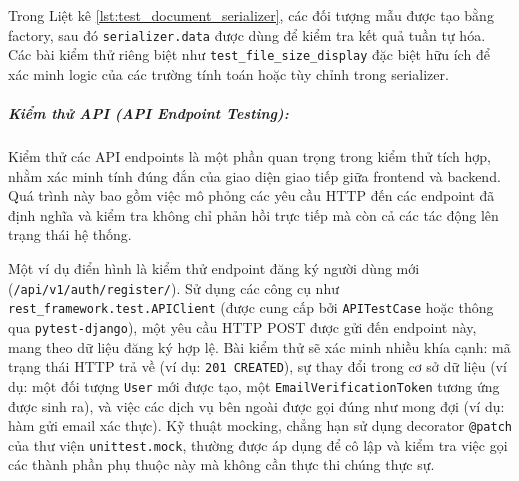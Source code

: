 Trong Liệt kê \ref{lst:test_document_serializer}, các đối tượng mẫu được tạo bằng factory, sau đó \texttt{serializer.data} được dùng để kiểm tra kết quả tuần tự hóa. Các bài kiểm thử riêng biệt như \texttt{test\_file\_size\_display} đặc biệt hữu ích để xác minh logic của các trường tính toán hoặc tùy chỉnh trong serializer.

\subparagraph{Kiểm thử API (API Endpoint Testing): }



Kiểm thử các API endpoints là một phần quan trọng trong kiểm thử tích hợp, nhằm xác minh tính đúng đắn của giao diện giao tiếp giữa frontend và backend. Quá trình này bao gồm việc mô phỏng các yêu cầu HTTP đến các endpoint đã định nghĩa và kiểm tra không chỉ phản hồi trực tiếp mà còn cả các tác động lên trạng thái hệ thống.

Một ví dụ điển hình là kiểm thử endpoint đăng ký người dùng mới (\texttt{/api/v1/auth/register/}). Sử dụng các công cụ như \texttt{rest\_framework.test.APIClient} (được cung cấp bởi \texttt{APITestCase} hoặc thông qua \texttt{pytest-django}), một yêu cầu HTTP POST được gửi đến endpoint này, mang theo dữ liệu đăng ký hợp lệ. Bài kiểm thử sẽ xác minh nhiều khía cạnh: mã trạng thái HTTP trả về (ví dụ: \texttt{201 CREATED}), sự thay đổi trong cơ sở dữ liệu (ví dụ: một đối tượng \texttt{User} mới được tạo, một \texttt{EmailVerificationToken} tương ứng được sinh ra), và việc các dịch vụ bên ngoài được gọi đúng như mong đợi (ví dụ: hàm gửi email xác thực). Kỹ thuật mocking, chẳng hạn sử dụng decorator \texttt{@patch} của thư viện \texttt{unittest.mock}, thường được áp dụng để cô lập và kiểm tra việc gọi các thành phần phụ thuộc này mà không cần thực thi chúng thực sự.

